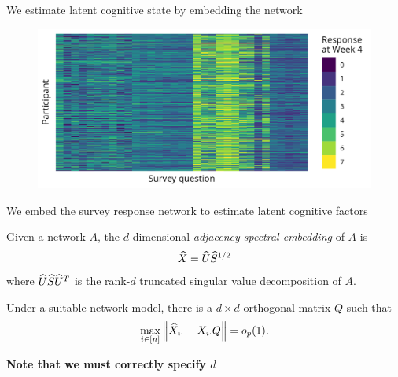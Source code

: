 \documentclass[aspectratio=169]{beamer}
\theoremstyle{remark}
\begin{document}
\begin{frame}{We estimate latent cognitive state by embedding the network}
    \centering
    \begin{figure}
        \includegraphics{figures/week4-responses.png}
    \end{figure}
\end{frame}



\begin{frame}{We embed the survey response network to estimate latent cognitive factors}

    \begin{definition}[ASE]

        Given a network $A$, the $d$-dimensional \emph{adjacency spectral embedding} of $A$ is
        \begin{align*}
            \widehat{X} = \widehat{U} \widehat{S}^{1/2}
        \end{align*}
        \noindent where $\widehat{U} \widehat{S} \widehat{U}^T$ is the rank-$d$ truncated singular value decomposition of $A$.
    \end{definition}

    \begin{lemma}
        Under a suitable network model, there is a $d \times d$ orthogonal matrix $Q$ such that
        \begin{equation*}
            \max_{i \in [n]} \, \norm*{\Xhat_{i \cdot} - \X_{i \cdot} Q} = \op{1}.
        \end{equation*}
    \end{lemma}

    \centering

    \textbf{Note that we must correctly specify $d$}
\end{frame}
\end{document}
